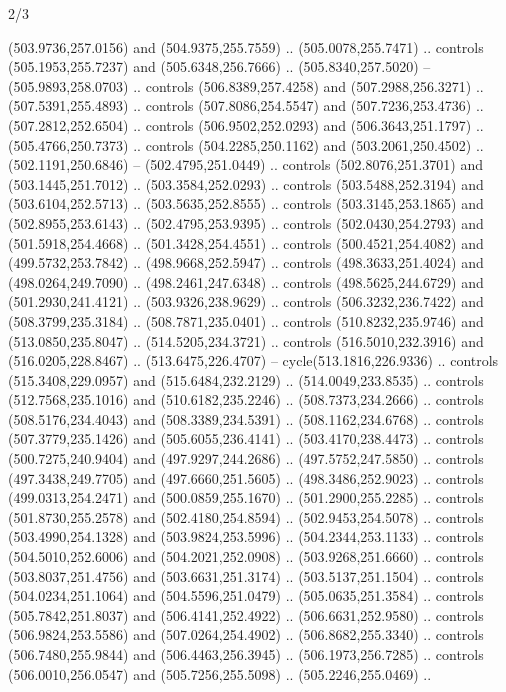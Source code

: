 \begin{flagdescription}{2/3}
\begin{scope}[xshift=0.5\flaglength,yshift=0.5\flagwidth,scale=\flagwidth/495.65]
\begin{scope}[y=0.8pt, x=0.8pt, yscale=-1,shift={(-463.76,-309.78)}]
  (503.9736,257.0156) and (504.9375,255.7559) .. (505.0078,255.7471) .. controls
  (505.1953,255.7237) and (505.6348,256.7666) .. (505.8340,257.5020) --
  (505.9893,258.0703) .. controls (506.8389,257.4258) and (507.2988,256.3271) ..
  (507.5391,255.4893) .. controls (507.8086,254.5547) and (507.7236,253.4736) ..
  (507.2812,252.6504) .. controls (506.9502,252.0293) and (506.3643,251.1797) ..
  (505.4766,250.7373) .. controls (504.2285,250.1162) and (503.2061,250.4502) ..
  (502.1191,250.6846) -- (502.4795,251.0449) .. controls (502.8076,251.3701) and
  (503.1445,251.7012) .. (503.3584,252.0293) .. controls (503.5488,252.3194) and
  (503.6104,252.5713) .. (503.5635,252.8555) .. controls (503.3145,253.1865) and
  (502.8955,253.6143) .. (502.4795,253.9395) .. controls (502.0430,254.2793) and
  (501.5918,254.4668) .. (501.3428,254.4551) .. controls (500.4521,254.4082) and
  (499.5732,253.7842) .. (498.9668,252.5947) .. controls (498.3633,251.4024) and
  (498.0264,249.7090) .. (498.2461,247.6348) .. controls (498.5625,244.6729) and
  (501.2930,241.4121) .. (503.9326,238.9629) .. controls (506.3232,236.7422) and
  (508.3799,235.3184) .. (508.7871,235.0401) .. controls (510.8232,235.9746) and
  (513.0850,235.8047) .. (514.5205,234.3721) .. controls (516.5010,232.3916) and
  (516.0205,228.8467) .. (513.6475,226.4707) -- cycle(513.1816,226.9336) ..
  controls (515.3408,229.0957) and (515.6484,232.2129) .. (514.0049,233.8535) ..
  controls (512.7568,235.1016) and (510.6182,235.2246) .. (508.7373,234.2666) ..
  controls (508.5176,234.4043) and (508.3389,234.5391) .. (508.1162,234.6768) ..
  controls (507.3779,235.1426) and (505.6055,236.4141) .. (503.4170,238.4473) ..
  controls (500.7275,240.9404) and (497.9297,244.2686) .. (497.5752,247.5850) ..
  controls (497.3438,249.7705) and (497.6660,251.5605) .. (498.3486,252.9023) ..
  controls (499.0313,254.2471) and (500.0859,255.1670) .. (501.2900,255.2285) ..
  controls (501.8730,255.2578) and (502.4180,254.8594) .. (502.9453,254.5078) ..
  controls (503.4990,254.1328) and (503.9824,253.5996) .. (504.2344,253.1133) ..
  controls (504.5010,252.6006) and (504.2021,252.0908) .. (503.9268,251.6660) ..
  controls (503.8037,251.4756) and (503.6631,251.3174) .. (503.5137,251.1504) ..
  controls (504.0234,251.1064) and (504.5596,251.0479) .. (505.0635,251.3584) ..
  controls (505.7842,251.8037) and (506.4141,252.4922) .. (506.6631,252.9580) ..
  controls (506.9824,253.5586) and (507.0264,254.4902) .. (506.8682,255.3340) ..
  controls (506.7480,255.9844) and (506.4463,256.3945) .. (506.1973,256.7285) ..
  controls (506.0010,256.0547) and (505.7256,255.5098) .. (505.2246,255.0469) ..

\end{scope}
\end{scope}
\end{flagdescription}
